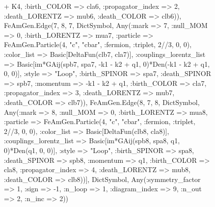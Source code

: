 \documentclass{revtex4}
\begin{document}
\begin{figure}[!htb]
\begin{center}
{+ K4, :birth_COLOR => cla6, :propagator_index => 2, :death_LORENTZ => mub6, :death_COLOR => clb6)), FeAmGen.Edge(7, 8, 7, Dict{Symbol, Any}(:mark => 7, :null_MOM => 0, :birth_LORENTZ => mua7, :particle => FeAmGen.Particle(4, "c", "cbar", :fermion, :triplet, 2//3, 0, 0), :color_list => Basic[DeltaFun(clb7, cla7)], :couplings_lorentz_list => Basic[im*GAij(spb7, spa7, -k1 - k2 + q1, 0)*Den(-k1 - k2 + q1, 0, 0)], :style => "Loop", :birth_SPINOR => spa7, :death_SPINOR => spb7, :momentum => -k1 - k2 + q1, :birth_COLOR => cla7, :propagator_index => 3, :death_LORENTZ => mub7, :death_COLOR => clb7)), FeAmGen.Edge(8, 7, 8, Dict{Symbol, Any}(:mark => 8, :null_MOM => 0, :birth_LORENTZ => mua8, :particle => FeAmGen.Particle(4, "c", "cbar", :fermion, :triplet, 2//3, 0, 0), :color_list => Basic[DeltaFun(clb8, cla8)], :couplings_lorentz_list => Basic[im*GAij(spb8, spa8, q1, 0)*Den(q1, 0, 0)], :style => "Loop", :birth_SPINOR => spa8, :death_SPINOR => spb8, :momentum => q1, :birth_COLOR => cla8, :propagator_index => 4, :death_LORENTZ => mub8, :death_COLOR => clb8))], Dict{Symbol, Any}(:symmetry_factor => 1, :sign => -1, :n_loop => 1, :diagram_index => 9, :n_out => 2, :n_inc => 2)) 
}
\end{center}
\end{figure}
\end{document}
